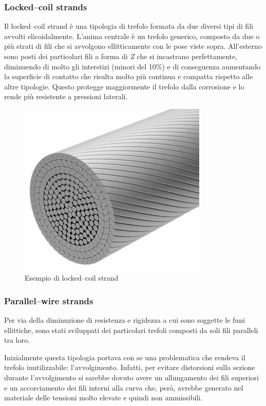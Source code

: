\subsubsection*{Locked--coil strands}
Il locked--coil strand è una tipologia di trefolo formata da due diversi tipi di fili avvolti elicoidalmente. L'anima centrale è un trefolo generico, composto da due o più strati di fili che si avvolgono ellitticamente con le pose viste sopra.
All'esterno sono posti dei particolari fili a forma di \textit{Z} che si incastrano perfettamente, diminuendo di molto gli interstizi (minori del \num{10}\%) e di conseguenza aumentando la superficie di contatto che risulta molto più continua e compatta rispetto alle altre tipologie. Questo protegge maggiormente il trefolo dalla corrosione e lo rende più resistente a pressioni laterali.

\begin{figure}
	\centering
	\includegraphics[width=9cm]{Immagini/Locked_coil_strands}
	\caption{Esempio di locked--coil strand}
	\label{fig:locked_coil_strands}
\end{figure}

\subsubsection*{Parallel--wire strands}
Per via della diminuzione di resistenza e rigidezza a cui sono soggette le funi ellittiche, sono stati sviluppati dei particolari trefoli composti da soli fili paralleli tra loro.

Inizialmente questa tipologia portava con se una problematica che rendeva il trefolo inutilizzabile: l'avvolgimento. Infatti, per evitare distorsioni sulla sezione durante l'avvolgimento si sarebbe dovuto avere un allungamento dei fili superiori e un accorciamento dei fili interni alla curva che, però, avrebbe generato nel materiale delle tensioni molto elevate e quindi non ammissibili.

